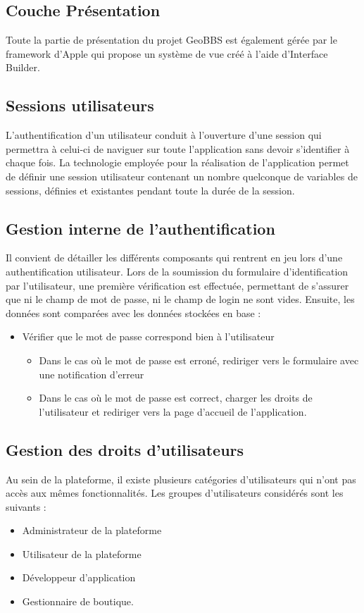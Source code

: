 \documentclass[a4paper,12pt]{report}
\begin{document}
\begin{onehalfspace}
\section{Couche Présentation}
Toute la partie de présentation du projet GeoBBS est également gérée par le framework d'Apple qui propose un système de vue créé à l'aide d'Interface Builder.

\subsection{Sessions utilisateurs}
L’authentification d’un utilisateur conduit à l’ouverture d’une session qui permettra à celui-ci de naviguer sur toute l'application sans devoir s’identifier à chaque fois. La technologie employée pour la réalisation de l'application permet de définir une session utilisateur contenant un nombre quelconque de variables de sessions, définies et existantes pendant toute la durée de la session.

\subsection{Gestion interne de l’authentification}
Il convient de détailler les différents composants qui rentrent en jeu lors d’une authentification utilisateur. Lors de la soumission du formulaire d’identification par l’utilisateur, une première vérification est effectuée, permettant de s’assurer que ni le champ de mot de passe, ni le champ de login ne sont vides. Ensuite, les données sont comparées avec les données stockées en base :
\begin{itemize}
  \item Vérifier que le mot de passe correspond bien à l’utilisateur
  \begin{itemize}
    \item Dans le cas où le mot de passe est erroné, rediriger vers le formulaire avec une notification d’erreur
    \item Dans le cas où le mot de passe est correct, charger les droits de l’utilisateur et rediriger vers la page d’accueil de l’application.
  \end{itemize}
\end{itemize}

\subsection{Gestion des droits d’utilisateurs}
Au sein de la plateforme, il existe plusieurs catégories d’utilisateurs qui n’ont pas accès aux mêmes fonctionnalités. Les groupes d’utilisateurs considérés sont les suivants :
\begin{itemize}
  \item Administrateur de la plateforme
  \item Utilisateur de la plateforme
  \item Développeur d'application
  \item Gestionnaire de boutique.
\end{itemize}

  \end{onehalfspace}
\end{document}
